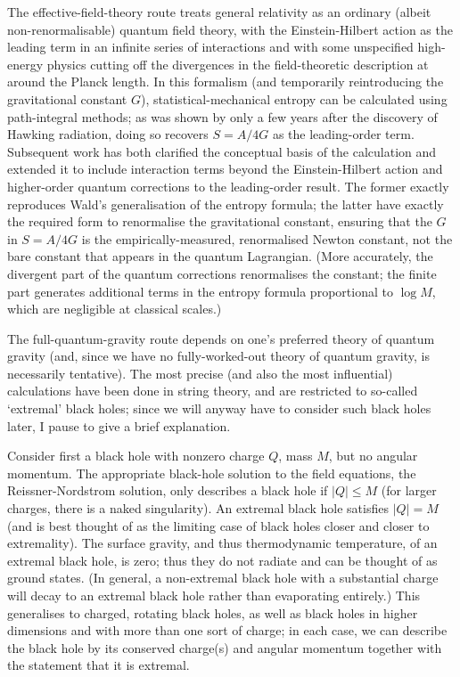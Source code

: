 \documentclass{article}
\begin{document}
The effective-field-theory route treats general relativity as an ordinary (albeit non-renormalisable) quantum field theory, with the Einstein-Hilbert action as the leading term in an infinite series of interactions and with some unspecified high-energy physics cutting off the divergences in the field-theoretic description at around the Planck length. In this formalism (and temporarily reintroducing the gravitational constant $G$), statistical-mechanical entropy can be calculated using path-integral methods; as was shown by  only a few years after the discovery of Hawking radiation, doing so recovers $S=A/4G$ as the leading-order term. Subsequent work has both clarified the conceptual basis of the calculation and extended it to include interaction terms beyond the Einstein-Hilbert action and higher-order quantum corrections to the leading-order result. The former exactly reproduces Wald's generalisation of the entropy formula; the latter have exactly the required form to renormalise the gravitational constant, ensuring that the $G$ in $S=A/4G$ is the empirically-measured, renormalised Newton constant, not the bare constant that appears in the quantum Lagrangian. (More accurately, the divergent part of the quantum corrections renormalises the constant; the finite part generates additional terms in the entropy formula proportional to $\log M$, which are negligible at classical scales.)

The full-quantum-gravity route depends on one's preferred theory of quantum gravity (and, since we have no fully-worked-out theory of quantum gravity, is necessarily tentative). The most precise (and also the most influential) calculations have been done in string theory, and are restricted to so-called `extremal' black holes; since we will anyway have to consider such black holes later, I pause to give a brief explanation.

Consider first a black hole with nonzero charge $Q$, mass $M$, but no angular momentum. The appropriate black-hole solution to the field equations, the Reissner-Nordstrom solution, only describes a black hole if $|Q|\leq M$ (for larger charges, there is a naked singularity). An extremal black hole satisfies $|Q|=M$ (and is best thought of as the limiting case of black holes closer and closer to extremality). The surface gravity, and thus thermodynamic temperature, of an extremal black hole, is zero; thus they do not radiate and can be thought of as ground states. (In general, a non-extremal black hole with a substantial charge will decay to an extremal black hole rather than evaporating entirely.) This generalises to charged, rotating black holes, as well as black holes in higher dimensions and with more than one sort of charge; in each case, we can describe the black hole by its conserved charge(s) and angular momentum together with the statement that it is extremal.
\end{document}
